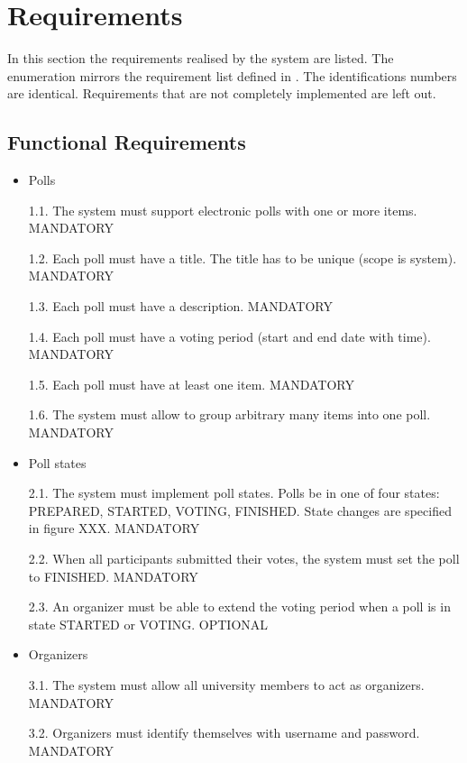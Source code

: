 \section{Requirements}

In this section the requirements realised by the system are listed. The enumeration mirrors the requirement list defined in \cite{Votes14}. The identifications numbers are identical. Requirements that are not completely implemented are left out.


\subsection{Functional Requirements}
  \begin{itemize}
\item Polls


1.1. The system must support electronic polls with one or more items. MANDATORY


1.2. Each poll must have a title. The title has to be unique (scope is system). MANDATORY


1.3. Each poll must have a description. MANDATORY


1.4. Each poll must have a voting period (start and end date with time). MANDATORY


1.5. Each poll must have at least one item. MANDATORY


1.6. The system must allow to group arbitrary many items into one poll. MANDATORY


\item Poll states


2.1. The system must implement poll states. Polls be in one of four states: PREPARED, STARTED,
VOTING, FINISHED. State changes are specified in figure XXX. MANDATORY


2.2. When all participants submitted their votes, the system must set the poll to FINISHED.
MANDATORY


2.3. An organizer must be able to extend the voting period when a poll is in state STARTED or
VOTING. OPTIONAL


\item Organizers


3.1. The system must allow all university members to act as organizers. MANDATORY


3.2. Organizers must identify themselves with username and password. MANDATORY



\end{itemize}
